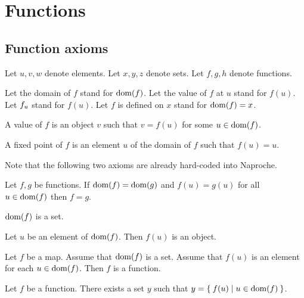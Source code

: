 \documentclass[../../sets-and-functions.ftl.tex]{subfiles}
\begin{document}
  \section{Functions}

  \subsection{Function axioms}

  \begin{forthel}
    Let $u,v,w$ denote elements.
    Let $x,y,z$ denote sets.
    Let $f,g,h$ denote functions.

    Let the domain of $f$ stand for $\operatorname{dom}(f)$.
    Let the value of $f$ at $u$ stand for $f(u)$.
    Let $f_{u}$ stand for $f(u)$.
    Let $f$ is defined on $x$ stand for $\operatorname{dom}(f) = x$.

    \begin{definition}
      A value of $f$ is an object $v$ such that $v = f(u)$ for some $u \in \operatorname{dom}(f)$.
    \end{definition}

    \begin{definition}
      A fixed point of $f$ is an element $u$ of the domain of $f$ such that $f(u) = u$.
    \end{definition}
  \end{forthel}

  Note that the following two axioms are already hard-coded into Naproche.

  \begin{forthel}
    \begin{axiom}
      Let $f,g$ be functions.
      If $\operatorname{dom}(f) = \operatorname{dom}(g)$ and $f(u) = g(u)$ for all $u \in \operatorname{dom}(f)$ then $f = g$.
    \end{axiom}

    \begin{axiom}[SF 02 01 459591]
      $\operatorname{dom}(f)$ is a set.
    \end{axiom}

    \begin{axiom}[SF 02 01 303112]
      Let $u$ be an element of $\operatorname{dom}(f)$.
      Then $f(u)$ is an object.
    \end{axiom}

    \begin{axiom}
      Let $f$ be a map.
      Assume that $\operatorname{dom}(f)$ is a set.
      Assume that $f(u)$ is an element for each $u \in \operatorname{dom}(f)$.
      Then $f$ is a function.
    \end{axiom}

    \begin{axiom}[Replacement]
      Let $f$ be a function. %
      There exists a set $y$ such that $y = \Set{f(u) | u \in \operatorname{dom}(f)}$.
    \end{axiom}
  \end{forthel}
\end{document}
